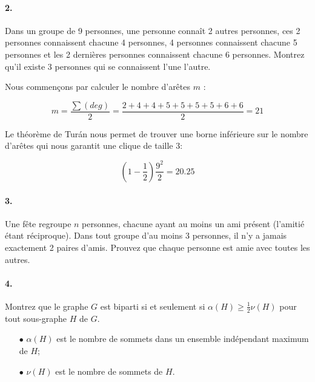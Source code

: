 \paragraph{2. } Dans un groupe de 9 personnes, une personne connaît 2 autres personnes, ces 2 personnes connaissent chacune 4 personnes, 4 personnes connaissent chacune 5 personnes et les 2 dernières personnes connaissent chacune 6 personnes. Montrez qu'il existe 3 personnes qui se connaissent l'une l'autre.

\begin{solution}
Nous commençons par calculer le nombre d'arêtes $m$ :

$$m=\frac{\sum(deg)}{2}=\frac{2+4+4+5+5+5+5+6+6}{2}=21$$

Le théorème de Turán nous permet de trouver une borne inférieure sur le nombre d'arêtes qui nous garantit une clique de taille 3:

$$\left(1-\frac{1}{2}\right)\frac{9^2}{2}=20.25$$
\end{solution}

\paragraph{3. } Une fête regroupe $n$ personnes, chacune ayant au moins un ami présent (l'amitié étant réciproque). Dans tout groupe d'au moins 3 personnes, il n'y a jamais exactement 2 paires d'amis. Prouvez que chaque personne est amie avec toutes les autres.

\begin{solution}
\end{solution}

\paragraph{4. } Montrez que le graphe $G$ est biparti si et seulement si $\alpha(H) \geq \frac{1}{2} \nu(H)$ pour tout sous-graphe $H$ de $G$.
\begin{enumerate}
  \item[$\bullet$] $\alpha(H)$ est le nombre de sommets dans un ensemble indépendant maximum de $H$;
  \item[$\bullet$] $\nu(H)$ est le nombre de sommets de $H$.
\end{enumerate}

